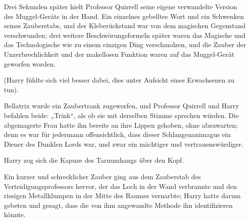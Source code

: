 Drei Sekunden später hielt Professor Quirrell seine eigene verwandelte Version des Muggel-Geräts in der Hand. Ein einzelnes gebelltes Wort und ein Schwenken seines Zauberstabs, und der Kleberückstand war von dem magischen Gegenstand verschwunden; drei weitere Beschwörungsformeln später waren das Magische und das Technologische wie zu einem einzigen Ding verschmolzen, und die Zauber der Unzerbrechlichkeit und der makellosen Funktion waren auf das Muggel-Gerät geworfen worden.

(Harry fühlte sich viel besser dabei, dies unter Aufsicht eines Erwachsenen zu tun).

Bellatrix wurde ein Zaubertrank zugeworfen, und Professor Quirrell und Harry befahlen beide:
„Trink“, als ob sie mit derselben Stimme sprechen würden. Die abgemagerte Frau hatte ihn bereits an ihre Lippen gehoben, ohne abzuwarten; denn es war für jedermann offensichtlich, dass dieser Schlangenanimagus ein Diener des Dunklen Lords war, und zwar ein mächtiger und vertrauenswürdiger.

Harry zog sich die Kapuze des Tarnumhangs über den Kopf.

Ein kurzer und schrecklicher Zauber ging aus dem Zauberstab des Verteidigungsprofessors hervor, der das Loch in der Wand verbrannte und den riesigen Metallklumpen in der Mitte des Raumes vernarbte; Harry hatte darum gebeten und gesagt, dass die von ihm angewandte Methode ihn identifizieren könnte.

